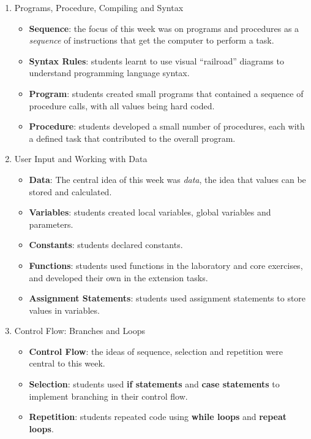 \begin{enumerate}
  \item Programs, Procedure, Compiling and Syntax
  \begin{itemize}[noitemsep,nolistsep]
  	\item \textbf{Sequence}: the focus of this week was on programs and procedures as a \emph{sequence} of instructions that get the computer to perform a task.
  	\item \textbf{Syntax Rules}: students learnt to use visual ``railroad'' diagrams \cite{Braz:1990} to understand programming language syntax.
  	\item \textbf{Program}: students created small programs that contained a sequence of procedure calls, with all values being hard coded.
  	\item \textbf{Procedure}: students developed a small number of procedures, each with a defined task that contributed to the overall program.
  \end{itemize}
  \item User Input and Working with Data
  \begin{itemize}[noitemsep,nolistsep]
  	\item \textbf{Data}: The central idea of this week was \emph{data}, the idea that values can be stored and calculated.
  	\item \textbf{Variables}: students created local variables, global variables and parameters.
  	\item \textbf{Constants}: students declared constants.
  	\item \textbf{Functions}: students used functions in the laboratory and core exercises, and developed their own in the extension tasks.
  	\item \textbf{Assignment Statements}: students used assignment statements to store values in variables. 
  \end{itemize}
  \item Control Flow: Branches and Loops
  \begin{itemize}[noitemsep,nolistsep]
  	\item \textbf{Control Flow}: the ideas of sequence, selection and repetition were central to this week.
  	\item \textbf{Selection}: students used \textbf{if statements} and  \textbf{case statements} to implement branching in their control flow.
  	\item \textbf{Repetition}: students repeated code using \textbf{while loops} and \textbf{repeat loops}.

\end{itemize}
\end{enumerate}
